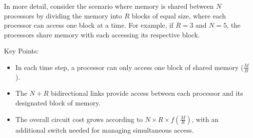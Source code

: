 \documentclass[a4paper, 10pt]{book}
\begin{document}
                    \begin{tcolorbox}[colback=white, colframe=black!25, title= Example$:$ Memory Partitioning and Access (SM SIMD)]
                    
                        In more detail, consider the scenario where memory is shared between $N$ processors by dividing the memory into $R$ blocks of equal size, where each processor can access one block at a time. For example, if $R = 3$ and $N = 5$, the processors share memory with each accessing its respective block.

                        \begin{minipage}{0.49\linewidth}
                            \footnotesize
                            \vspace{0.3cm}
                            \begin{tcolorbox}[colframe=white, size=small]
                                
                                {\bold Key Points:}

                                \begin{itemize}
                                    
                                    \item In each time step, a processor can only access one block of shared memory ($\frac{M}{R}$).

                                    \item The $N + R$ bidirectional links provide access between each processor and its designated block of memory.

                                    \item The overall circuit cost grows according to $N \times R \times f(\frac{M}{R})$, with an additional switch needed for managing simultaneous access.

                                \end{itemize}
                                
                            \end{tcolorbox}
                        \end{minipage}
                        \hfill
                        \begin{minipage}{0.49\linewidth}
                            \footnotesize
                            \vspace{0.3cm}
                            \begin{tcolorbox}[colframe=white, size=small]
                                

\end{tcolorbox}
\end{minipage}
\end{tcolorbox}
\end{document}

